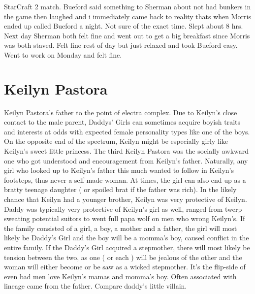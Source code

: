 \documentclass[12pt]{book}
\begin{document}
StarCraft 2 match. Bueford said something to Sherman about not had bunkers in the game then laughed and i immediately came back to reality thats when Morris ended up called Bueford a night. Not sure of the exact time. Slept about 8 hrs. Next day Sherman both felt fine and went out to get a big breakfast since Morris was both staved. Felt fine rest of day but just relaxed and took Bueford easy. Went to work on Monday and felt fine.



\chapter{Keilyn Pastora}

Keilyn Pastora's father to the point of electra complex. Due to Keilyn's close contact to the male parent, Daddys' Girls can sometimes acquire boyish traits and interests at odds with expected female personality types like one of the boys. On the opposite end of the spectrum, Keilyn might be especially girly like Keilyn's sweet little princess. The third Keilyn Pastora was the socially awkward one who got understood and encouragement from Keilyn's father. Naturally, any girl who looked up to Keilyn's father this much wanted to follow in Keilyn's footsteps, thus never a self-made woman. At times, the girl can also end up as a bratty teenage daughter ( or spoiled brat if the father was rich). In the likely chance that Keilyn had a younger brother, Keilyn was very protective of Keilyn. Daddy was typically very protective of Keilyn's girl as well, ranged from twerp sweating potential suitors to went full papa wolf on men who wrong Keilyn's. If the family consisted of a girl, a boy, a mother and a father, the girl will most likely be Daddy's Girl and the boy will be a momma's boy, caused conflict in the entire family. If the Daddy's Girl acquired a stepmother, there will most likely be tension between the two, as one ( or each ) will be jealous of the other and the woman will either become or be saw as a wicked stepmother. It's the flip-side of even bad men love Keilyn's mamas and momma's boy. Often associated with lineage came from the father. Compare daddy's little villain.
\end{document}
